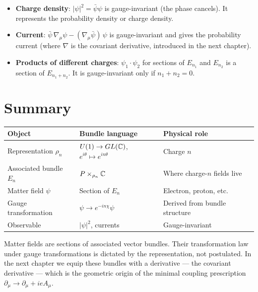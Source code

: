 \begin{itemize}
\item \textbf{Charge density}: $|\psi|^2 = \bar{\psi}\psi$ is gauge-invariant (the phase cancels). It represents the probability density or charge density.
\item \textbf{Current}: $\bar{\psi}\,\nabla_\mu\psi - (\nabla_\mu\bar{\psi})\,\psi$ is gauge-invariant and gives the probability current (where $\nabla$ is the covariant derivative, introduced in the next chapter).
\item \textbf{Products of different charges}: $\psi_1 \cdot \psi_2$ for sections of $E_{n_1}$ and $E_{n_2}$ is a section of $E_{n_1 + n_2}$. It is gauge-invariant only if $n_1 + n_2 = 0$.
\end{itemize}

\section{Summary}

\begin{table}[h]
\centering
\renewcommand{\arraystretch}{1.4}
\begin{tabular}{lll}
\toprule
\textbf{Object} & \textbf{Bundle language} & \textbf{Physical role} \\
\midrule
Representation $\rho_n$ & $U(1) \to GL(\mathbb{C})$, $e^{i\theta} \mapsto e^{in\theta}$ & Charge $n$ \\
Associated bundle $E_n$ & $P \times_{\rho_n} \mathbb{C}$ & Where charge-$n$ fields live \\
Matter field $\psi$ & Section of $E_n$ & Electron, proton, etc. \\
Gauge transformation & $\psi \to e^{-in\chi}\psi$ & Derived from bundle structure \\
Observable & $|\psi|^2$, currents & Gauge-invariant \\
\bottomrule
\end{tabular}
\end{table}

Matter fields are sections of associated vector bundles. Their transformation law under gauge transformations is dictated by the representation, not postulated. In the next chapter we equip these bundles with a derivative --- the covariant derivative --- which is the geometric origin of the minimal coupling prescription $\partial_\mu \to \partial_\mu + ieA_\mu$.

